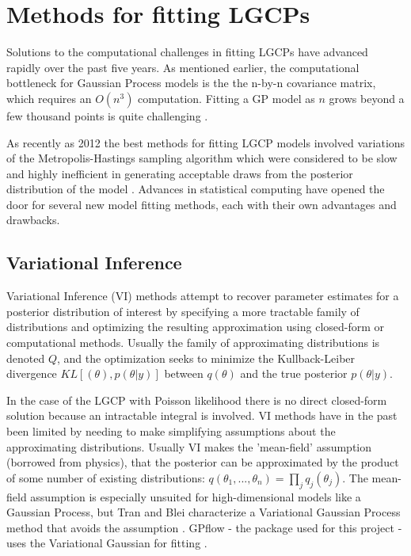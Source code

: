 \section{Methods for fitting LGCPs}

Solutions to the computational challenges in fitting LGCPs have advanced rapidly over the past five years. As mentioned earlier, the computational bottleneck for Gaussian Process models is the the n-by-n covariance matrix, which requires an $O(n^3)$ computation. Fitting a GP model as $n$ grows beyond a few thousand points is quite challenging \cite{gelman2013bayesian}. \par

 As recently as 2012 the best methods for fitting LGCP models involved variations of the Metropolis-Hastings sampling algorithm which were considered to be slow and highly inefficient in generating acceptable draws from the posterior distribution of the model \cite{murray_2012}. Advances in statistical computing have opened the door for several new model fitting methods, each with their own advantages and drawbacks.

\subsection{Variational Inference}

Variational Inference (VI) methods attempt to recover parameter estimates for a posterior distribution of interest by specifying a more tractable family of distributions and optimizing the resulting approximation using closed-form or computational methods. Usually the family of approximating distributions is denoted $Q$, and the optimization seeks to minimize the Kullback-Leiber divergence $KL[(\theta), p(\theta|y)]$ between $q(\theta)$ and the true posterior $p(\theta|y)$. \par

In the case of the LGCP with Poisson likelihood there is no direct closed-form solution because an intractable integral is involved. VI methods have in the past been limited by needing to make simplifying assumptions about the approximating distributions. Usually VI makes the 'mean-field' assumption (borrowed from physics), that the posterior can be approximated by the product of some number of existing distributions: $q(\theta_1,...,\theta_n)= \prod_j{q_j(\theta_j)}$. The mean-field assumption is especially unsuited for high-dimensional models like a Gaussian Process, but Tran and Blei characterize a Variational Gaussian Process method that avoids the assumption \cite{tran_2015}. GPflow - the package used for this project - uses the Variational Gaussian  for fitting \cite{GPflow2017}.\par

